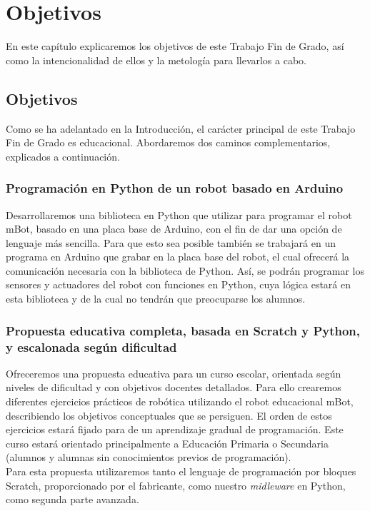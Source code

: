 \chapter{Objetivos}
\label{cap:objetivos}
En este capítulo explicaremos los objetivos de este Trabajo Fin de Grado, así como la intencionalidad de ellos y la metología para llevarlos a cabo.
\section{Objetivos}\label{sec:objetivos}
Como se ha adelantado en la Introducción, el carácter principal de este Trabajo Fin de Grado es educacional. Abordaremos dos caminos complementarios, explicados a continuación. 

\subsection{Programación en Python de un robot basado en Arduino}\label{subsec:obj1} 
Desarrollaremos una biblioteca en Python que utilizar para programar el robot mBot, basado en una placa base de Arduino, con el fin de dar una opción de lenguaje más sencilla. Para que esto sea posible también se trabajará en un programa en Arduino que grabar en la placa base del robot, el cual ofrecerá la comunicación necesaria con la biblioteca de Python. Así, se podrán programar los sensores y actuadores del robot con funciones en Python, cuya lógica estará en esta biblioteca y de la cual no tendrán que preocuparse los alumnos. 
	
\subsection{Propuesta educativa completa, basada en Scratch y Python, y escalonada según dificultad} \label{subsec:obj2}
Ofreceremos una propuesta educativa para un curso escolar, orientada según niveles de dificultad y con objetivos docentes detallados. Para ello crearemos diferentes ejercicios prácticos de robótica utilizando el robot educacional mBot, describiendo los objetivos conceptuales que se persiguen. El orden de estos ejercicios estará fijado para de un aprendizaje gradual de programación. Este curso estará orientado principalmente a Educación Primaria o Secundaria (alumnos y alumnas sin conocimientos previos de programación). \\
Para esta propuesta utilizaremos tanto el lenguaje de programación por bloques Scratch, proporcionado por el fabricante, como nuestro \textit{midleware} en Python, como segunda parte avanzada.
	
